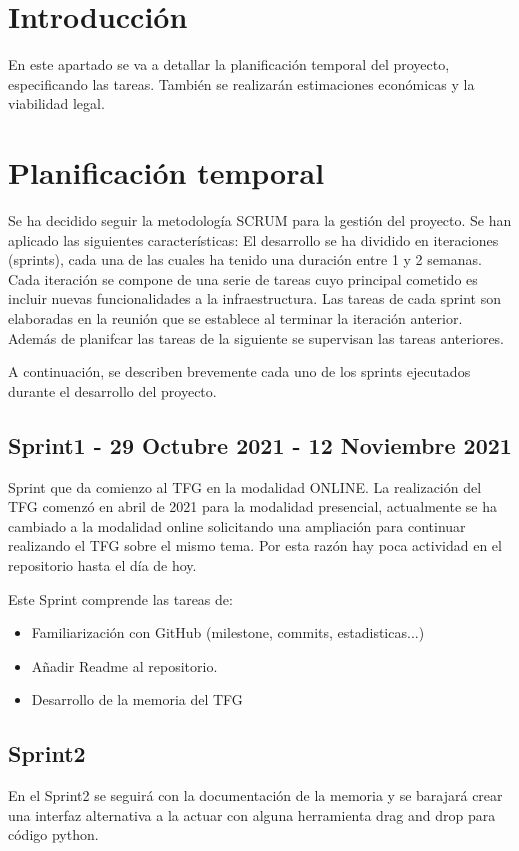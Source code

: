 
\section{Introducción}
En este apartado se va a detallar la planificación temporal del proyecto,
especificando las tareas. También se realizarán estimaciones económicas y la
viabilidad legal.
\section{Planificación temporal}

Se ha decidido seguir la metodología SCRUM para la gestión del proyecto.
Se han aplicado las siguientes características:
El desarrollo se ha dividido en iteraciones (sprints), cada una de las cuales ha tenido una duración entre 1 y 2 semanas. Cada iteración se compone de una serie de tareas cuyo principal cometido es incluir nuevas funcionalidades a la infraestructura.
Las tareas de cada sprint son elaboradas en la reunión que se establece al terminar la iteración anterior. Además de planifcar las tareas de la siguiente se supervisan las tareas anteriores.

A continuación, se describen brevemente cada uno de los sprints ejecutados durante el desarrollo del proyecto.

\subsection{Sprint1 - 29 Octubre 2021 - 12 Noviembre 2021}
Sprint que da comienzo al TFG en la modalidad ONLINE. La realización del TFG comenzó en abril de 2021 para la modalidad presencial, actualmente se ha cambiado a la modalidad online solicitando una ampliación para continuar realizando el TFG sobre el mismo tema. Por esta razón hay poca actividad en el repositorio hasta el día de hoy.

Este Sprint comprende las tareas de:
\begin{itemize}
\item Familiarización con GitHub (milestone, commits, estadisticas...)
\item Añadir Readme al repositorio.
\item Desarrollo de la memoria del TFG
\end{itemize}

\subsection{Sprint2}
En el Sprint2 se seguirá con la documentación de la memoria y se barajará crear una interfaz alternativa a la actuar con alguna herramienta drag and drop para código python.

